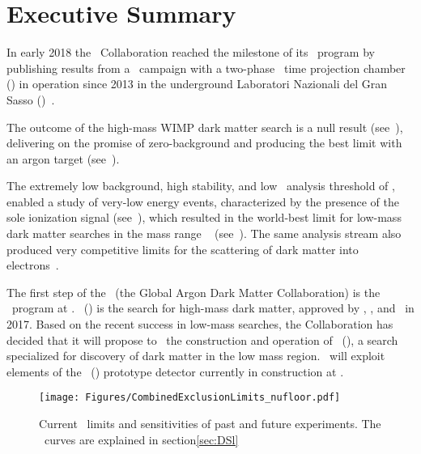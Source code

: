 \section{Executive Summary}


In early 2018 the \DS\ Collaboration  reached the milestone of its \DSfs\ program by publishing results from a \DSfDdLTPostQualCut\ campaign with a two-phase \LAr\ time projection chamber (\LArTPC) in operation since 2013 in the underground Laboratori Nazionali del Gran Sasso (\LNGS)~\cite{Agnes:2018vl,Agnes:2018fg,Agnes:2018ft}.

The outcome of the high-mass WIMP dark matter search is a null result (see~), delivering on the promise of zero-background and producing the best limit with an argon target (see~).

The extremely low background, high stability, and low \DSfTriggerSTwoAnalysisThreshold\ analysis threshold of \DSfs, enabled a study of very-low energy events, characterized by the presence of the sole ionization signal (see~), which resulted in the world-best limit for low-mass dark matter searches in the mass range \DSfLowMassBestRecordRange~\cite{Agnes:2018fg} (see~).  The same analysis stream also produced very competitive limits for the scattering of dark matter into electrons~\cite{Agnes:2018ft}.



The first step of the \GADMC\ (the Global Argon Dark Matter Collaboration) is the \DS\ program at \LNGS.  \DSk\ (\DSks) is the search for high-mass dark matter, approved by \INFN, \NSF, and \LNGS\ in 2017.  Based on the recent success in low-mass searches, the Collaboration has decided that it will propose to \LNGS\ the construction and operation of \DSl\ (\DSls), a search specialized for discovery of dark matter in the low mass region.  \DSls\ will exploit elements of the \DSp\ (\DSps) prototype detector currently in construction at \CERN.


\begin{figure*}[!t]
\texttt{[image: Figures/CombinedExclusionLimits\_nufloor.pdf]}
\caption[Current \DM\ limits and sensitivities for future experiments.]{Current \DM\ limits and sensitivities of past and  future experiments. The \DSls\ curves are explained in section\ref{sec:DSl}}
\label{fig:DSklSensitivity}
\end{figure*}